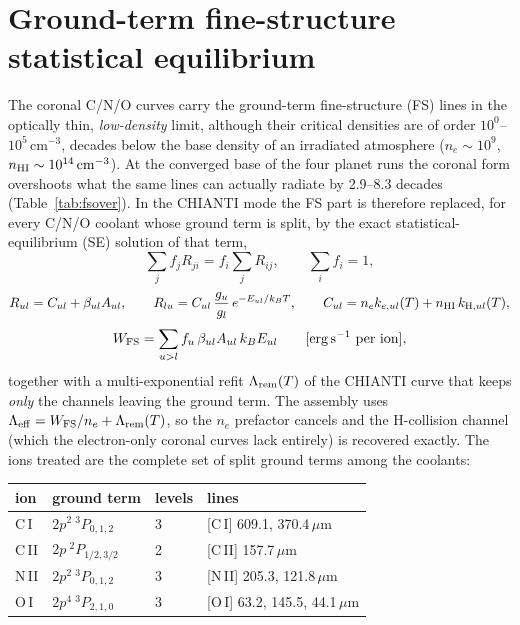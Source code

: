 \documentclass[english,a4paper]{my_memo}
\begin{document}
\section{Ground-term fine-structure statistical equilibrium}
\label{sec:fs}

The coronal C/N/O curves carry the ground-term fine-structure (FS) lines
in the optically thin, \emph{low-density} limit, although their critical
densities are of order $10^0$--$10^5\,\mathrm{cm^{-3}}$, decades below
the base density of an irradiated atmosphere
($n_e\sim10^9$, $n_{\rm HI}\sim10^{14}\,\mathrm{cm^{-3}}$).  At the
converged base of the four planet runs the coronal form overshoots what
the same lines can actually radiate by 2.9--8.3 decades
(Table~\ref{tab:fsover}).  In the CHIANTI mode the FS part is therefore
replaced, for every C/N/O coolant whose ground term is split, by the
exact statistical-equilibrium (SE) solution of that term,
\begin{equation}
\sum_j f_j R_{ji} = f_i \sum_j R_{ij},\qquad \sum_i f_i = 1,
\label{eq:se}
\end{equation}
\begin{equation}
R_{ul} = C_{ul} + \beta_{ul} A_{ul},\qquad
R_{lu} = C_{ul}\,\frac{g_u}{g_l}\,e^{-E_{ul}/k_BT},\qquad
C_{ul} = n_e k_{e,ul}(T) + n_{\rm HI}\,k_{{\rm H},ul}(T),
\end{equation}
\begin{equation}
W_{\rm FS} = \sum_{u>l} f_u\,\beta_{ul}A_{ul}\,k_B E_{ul}
\qquad [\mathrm{erg\,s^{-1}}\ \mathrm{per\ ion}],
\label{eq:wfs}
\end{equation}
together with a multi-exponential refit $\Lambda_{\rm rem}(T)$ of the
CHIANTI curve that keeps \emph{only} the channels leaving the ground
term.  The assembly uses
$\Lambda_{\rm eff} = W_{\rm FS}/n_e + \Lambda_{\rm rem}(T)$, so the
$n_e$ prefactor cancels and the H-collision channel (which the
electron-only coronal curves lack entirely) is recovered exactly.
The ions treated are the complete set of split ground terms among the
coolants:

\begin{center}
\begin{tabular}{llll}
\hline
ion & ground term & levels & lines \\
\hline
C\,I  & $2p^2\ ^3P_{0,1,2}$   & 3 & [C\,I] 609.1, 370.4\,$\mu$m \\
C\,II & $2p\ ^2P_{1/2,3/2}$   & 2 & [C\,II] 157.7\,$\mu$m \\
N\,II & $2p^2\ ^3P_{0,1,2}$   & 3 & [N\,II] 205.3, 121.8\,$\mu$m \\
O\,I  & $2p^4\ ^3P_{2,1,0}$   & 3 & [O\,I] 63.2, 145.5, 44.1\,$\mu$m \\
\hline
\end{tabular}
\end{center}
\end{document}
